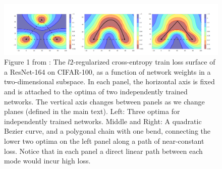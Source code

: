 \begin{figure}[H]
	\centering
	\includegraphics[width=1\linewidth]{./Figures/modeconnect.png}
	\caption{Figure 1 from \textcite{garipov2018loss}: The $l2$-regularized cross-entropy train loss surface of a ResNet-164 on CIFAR-100, as a function of network weights in a two-dimensional subspace. In each panel, the horizontal axis is fixed and is attached to the optima of two independently trained networks. The vertical axis changes between panels as we change planes (defined in the main text). Left: Three optima for independently trained networks. Middle and Right: A quadratic Bezier curve, and a polygonal chain with one bend, connecting the lower two optima on the left panel along a path of near-constant loss. Notice that in each panel a direct linear path between each mode would incur high loss.
}
	\label{modeconnect}
\end{figure}

